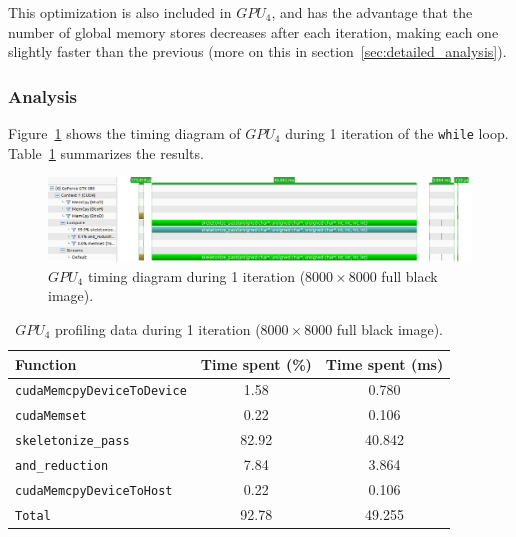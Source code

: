 \documentclass[11pt,a4paper]{article}
\begin{document}
                This optimization is also included in $GPU_{4}$, and has the advantage that the number of global memory stores decreases after each iteration, making each one slightly faster than the previous (more on this in section~\ref{sec:detailed_analysis}).

            \subsubsection{Analysis}
                Figure~\ref{fig:black_gpu4_timing_diagram} shows the timing diagram of $GPU_{4}$ during 1 iteration of the \verb+while+ loop.
                Table~\ref{tab:black_gpu4_timing_diagram} summarizes the results.

                \begin{figure}[h]
                    \centering
                    \includegraphics[width=\textwidth]{figs/black_gpu4_timing_diagram.png}
                    \caption{$GPU_{4}$ timing diagram during 1 iteration ($8000 \times 8000$ full black image).}
                    \label{fig:black_gpu4_timing_diagram}
                \end{figure}

                \begin{table}[ht]
                    \centering
                    \begin{tabular}{lcc}
                        \toprule
                        Function                        & Time spent (\%) & Time spent (ms) \\
                        \midrule
                        \verb+cudaMemcpyDeviceToDevice+ & 1.58            & 0.780           \\
                        \verb+cudaMemset+               & 0.22            & 0.106           \\
                        \verb+skeletonize_pass+         & 82.92           & 40.842          \\
                        \verb+and_reduction+            & 7.84            & 3.864           \\
                        \verb+cudaMemcpyDeviceToHost+   & 0.22            & 0.106           \\
                        \midrule
                        \verb+Total+                    & 92.78           & 49.255          \\
                        \bottomrule
                    \end{tabular}
                    \caption{$GPU_{4}$ profiling data during 1 iteration ($8000 \times 8000$ full black image).}
                    \label{tab:black_gpu4_timing_diagram}
                \end{table}
\end{document}
